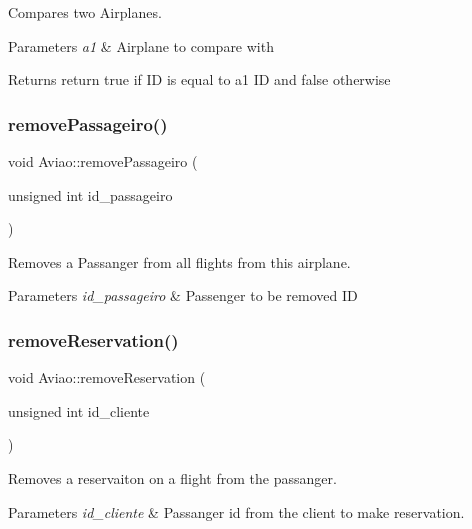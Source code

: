 Compares two Airplanes. 


\begin{DoxyParams}{Parameters}
{\em a1} & Airplane to compare with\\
\hline
\end{DoxyParams}
\begin{DoxyReturn}{Returns}
return true if ID is equal to a1 ID and false otherwise 
\end{DoxyReturn}
\mbox{\label{class_aviao_a67eee8e5beed10aa0a93792f1a5e77ed}} 
\subsubsection{\texorpdfstring{remove\+Passageiro()}{removePassageiro()}}
{\footnotesize\ttfamily void Aviao\+::remove\+Passageiro (\begin{DoxyParamCaption}\item[{unsigned int}]{id\+\_\+passageiro }\end{DoxyParamCaption})}



Removes a Passanger from all flights from this airplane. 


\begin{DoxyParams}{Parameters}
{\em id\+\_\+passageiro} & Passenger to be removed ID \\
\hline
\end{DoxyParams}
\mbox{\label{class_aviao_a8bb3ed95497a4ff53f3fb5c141abc216}} 
\subsubsection{\texorpdfstring{remove\+Reservation()}{removeReservation()}}
{\footnotesize\ttfamily void Aviao\+::remove\+Reservation (\begin{DoxyParamCaption}\item[{unsigned int}]{id\+\_\+cliente }\end{DoxyParamCaption})}



Removes a reservaiton on a flight from the passanger. 


\begin{DoxyParams}{Parameters}
{\em id\+\_\+cliente} & Passanger id from the client to make reservation. \\
\hline
\end{DoxyParams}
\mbox{\label{class_aviao_ac0983f6c66d1954083486e53f846956a}} 
